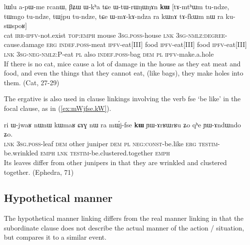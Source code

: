 \documentclass[oldfontcommands,oneside,a4paper,11pt]{article}
\newcommand{\ipa}[1]{{\phon \mbox{#1}}} %
\newcommand{\refb}[1]{(\ref{#1})}
\begin{document}
\begin{exe}
\ex \label{ex:WtWrWNWNAn}
\gll
\ipa{lɯlu}         	\ipa{a-pɯ-me}         	\ipa{rcanɯ,}         	\ipa{βʑɯ}         	\ipa{ɯ-kʰa}         	\ipa{tɕe}         	\ipa{ɯ-tɯ-rɯŋɯŋɤn}         	\ipa{\textbf{kɯ}}          [\ipa{tɤ-mtʰɯm}         	\ipa{tu-ndze,}         	\ipa{tɯmgo}         	\ipa{tu-ndze,}         	\ipa{tɯjpu}         	\ipa{tu-ndze,}         \ipa{tɕe}         	\ipa{ɯ-mɤ-kɤ-ndza}         	\ipa{ra}         	\ipa{kɯnɤ}         	\ipa{tɤ-fkɯm}         	\ipa{nɯ} \ipa{ra}         	\ipa{ku-sɯspoʁ}]         \\
cat \textsc{irr-ipfv}-not.exist \textsc{top:emph} mouse \textsc{3sg.poss}-house \textsc{lnk} \textsc{3sg-nmlz:degree}-cause.damage \textsc{erg} \textsc{indef.poss}-meat \textsc{ipfv}-eat[III] food \textsc{ipfv}-eat[III] food \textsc{ipfv}-eat[III]  \textsc{lnk} \textsc{3sg-neg-nmlz:P}-eat \textsc{pl} also \textsc{indef.poss}-bag \textsc{dem} \textsc{pl} \textsc{ipfv}-make.a.hole \\
\glt  If there is no cat, mice cause a lot of damage in the house as they eat meat and food, and even the things that they cannot eat, (like bags), they make holes into them. (Cat, 27-29)
\end{exe}
 
 
 The ergative is also used in clause linkings involving the verb \ipa{fse} `be like' in the focal clause, as in \refb{ex:mWjfse.kW}.
 
 \begin{exe}
\ex \label{ex:mWjfse.kW}
\gll
\ipa{ri} 	\ipa{ɯ-jwaʁ} 	\ipa{nɯnɯ} 	\ipa{kɯmaʁ} 	\ipa{ɕɤɣ} 	\ipa{nɯ} \ipa{ra} 	\ipa{mɯ́j-fse} 	\ipa{\textbf{kɯ}} 	\ipa{ɲɯ-ɤrʁɯrʁu} 	\ipa{ʑo} 	\ipa{qʰe} 	\ipa{ɲɯ-ɤndɯndo} 	\ipa{ʑo.} \\
\textsc{lnk} \textsc{3sg.poss}-leaf \textsc{dem} other juniper \textsc{dem} \textsc{pl} \textsc{neg:const}-be.like \textsc{erg} \textsc{testim}-be.wrinkled \textsc{emph} \textsc{lnk}  \textsc{testim}-be.clustered.together \textsc{emph} \\
\glt Its leaves differ from other junipers in that they are wrinkled and clustered together. (Ephedra, 71)
 \end{exe}
 
\subsection{Hypothetical manner}
The hypothetical manner linking differs from the real manner linking in that the subordinate clause does not describe the actual manner of the action / situation, but compares it to a similar event. 
\end{document}
